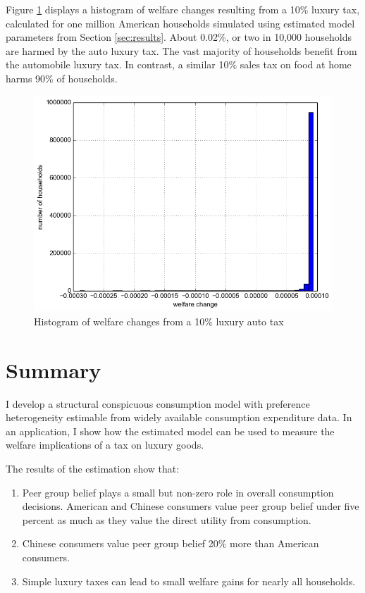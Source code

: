 \documentclass[12pt]{article}
\begin{document}
Figure \ref{fig:wel_change_10} displays a histogram of welfare changes resulting from a 10\% luxury tax, calculated for one million American households simulated using estimated model parameters from Section \ref{sec:results}.  About 0.02\%, or two in 10,000 households are harmed by the auto luxury tax.  The vast majority of households benefit from the automobile luxury tax.  In contrast, a similar 10\% sales tax on food at home harms 90\% of households.

\begin{figure}
    \centering
	\includegraphics[scale=.6]{pics/tax_hist_Car10.png}
    \caption{Histogram of welfare changes from a 10\% luxury auto tax}
    \label{fig:wel_change_10}
\end{figure}

\section{Summary}
I develop a structural conspicuous consumption model with preference heterogeneity estimable from widely available consumption expenditure data.  In an application, I show how the estimated model can be used to measure the welfare implications of a tax on luxury goods.

The results of the estimation show that:
\begin{enumerate}
    \item Peer group belief plays a small but non-zero role in overall consumption decisions.  American and Chinese consumers value peer group belief under five percent as much as they value the direct utility from consumption.
    \item Chinese consumers value peer group belief 20\% more than American consumers.
    \item Simple luxury taxes can lead to small welfare gains for nearly all households.
\end{enumerate}
\end{document}
